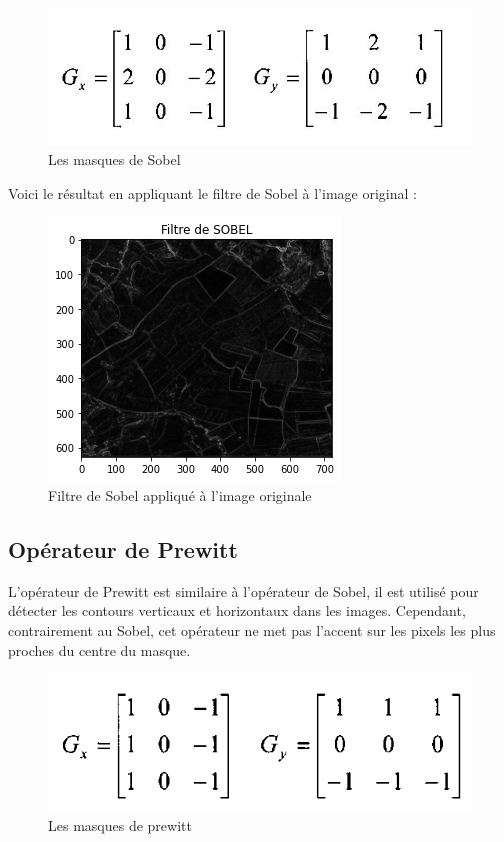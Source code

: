 \documentclass[12pt, openany]{report}
\begin{document}
\begin{figure}[H]
\centering
\includegraphics[scale=0.9]{sobel_masque.jpg}
\caption{Les masques de Sobel}
\end{figure}

Voici le résultat en appliquant le filtre de Sobel à l'image original :

\begin{figure}[H]
\centering
\includegraphics[scale=0.9]{sobel_result.png}
\caption{Filtre de Sobel appliqué à l'image originale}
\end{figure}


\subsection{Opérateur de Prewitt}
L'opérateur de Prewitt est similaire à l'opérateur de Sobel, il est utilisé pour détecter les contours verticaux et horizontaux dans les images. Cependant, contrairement au Sobel, cet opérateur ne met pas l'accent sur les pixels les plus proches du centre du masque.

\begin{figure}[H]
\centering
\includegraphics[scale=0.9]{prewit_masque.png}
\caption{Les masques de prewitt}
\end{figure}
\end{document}
